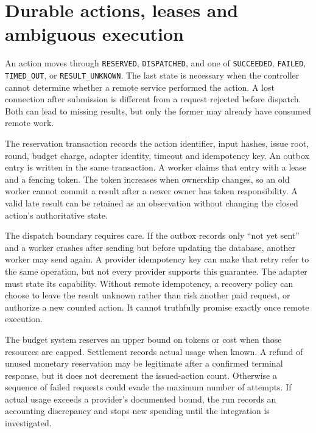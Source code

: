 \section{Durable actions, leases and ambiguous execution}
\label{merge:M06:17}


An action moves through \texttt{RESERVED}, \texttt{DISPATCHED}, and one of
\texttt{SUCCEEDED}, \texttt{FAILED}, \texttt{TIMED\_OUT}, or
\texttt{RESULT\_UNKNOWN}. The last state is necessary when the controller cannot
determine whether a remote service performed the action. A lost connection after
submission is different from a request rejected before dispatch. Both can lead
to missing results, but only the former may already have consumed remote work.

The reservation transaction records the action identifier, input hashes, issue
root, round, budget charge, adapter identity, timeout and idempotency key. An
outbox entry is written in the same transaction. A worker claims that entry with
a lease and a fencing token. The token increases when ownership changes, so an
old worker cannot commit a result after a newer owner has taken responsibility.
A valid late result can be retained as an observation without changing the closed
action's authoritative state.

The dispatch boundary requires care. If the outbox records only ``not yet sent''
and a worker crashes after sending but before updating the database, another
worker may send again. A provider idempotency key can make that retry refer to the
same operation, but not every provider supports this guarantee. The adapter must
state its capability. Without remote idempotency, a recovery policy can choose to
leave the result unknown rather than risk another paid request, or authorize a
new counted action. It cannot truthfully promise exactly once remote execution.


The budget system reserves an upper bound on tokens or cost when those resources
are capped. Settlement records actual usage when known. A refund of unused
monetary reservation may be legitimate after a confirmed terminal response, but
it does not decrement the issued-action count. Otherwise a sequence of failed
requests could evade the maximum number of attempts. If actual usage exceeds a
provider's documented bound, the run records an accounting discrepancy and stops
new spending until the integration is investigated.

